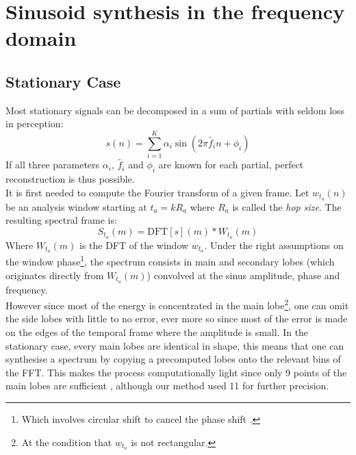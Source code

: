 \documentclass[]{article}
\begin{document}
\section{Sinusoid synthesis in the frequency domain}

\subsection{Stationary Case}
\hspace{15pt}Most stationary signals can be decomposed in a sum of partials with seldom loss in perception:
\begin{equation}
s(n) = \sum_{i=1}^{K}\alpha_i \sin(2\pi \tilde{f_i} n + \phi_{i})
\end{equation}
If all three parameters $\alpha_i$, $\tilde{f_i}$ and $\phi_{i}$ are known for each partial, perfect reconstruction is thus possible.\\
It is first needed to compute the Fourier transform of a given frame. Let $w_{t_a}(n)$ be an analysis window starting at $t_a = kR_a$ where $R_a$ is called the \emph{hop size}. The resulting spectral frame is:
\begin{equation}
S_{t_a}(m) = \text{DFT}[s](m) \ast W_{t_a}(m)
\end{equation}
Where $W_{t_a}(m)$ is the DFT of the window $w_{t_a}$. Under the right assumptions on the window phase\footnote{Which involves circular shift to cancel the phase shift \cite{arfib2002time}.}, the spectrum consists in main and secondary lobes (which originates directly from $W_{t_a}(m)$) convolved at the sinus amplitude, phase and frequency.\\
However since most of the energy is concentrated in the main lobe\footnote{At the condition that $w_{t_a}$ is not rectangular.}, one can omit the side lobes with little to no error, ever more so since most of the error is made on the edges of the temporal frame where the amplitude is small. In the stationary case, every main lobes are identical in shape, this means that one can synthesise a spectrum by copying a precomputed lobes onto the relevant bins of the FFT. This makes the process computationally light since only 9 points of the main lobes are sufficient \cite{rodet1992spectral}, although our method used 11 for further precision.\\
\end{document}
